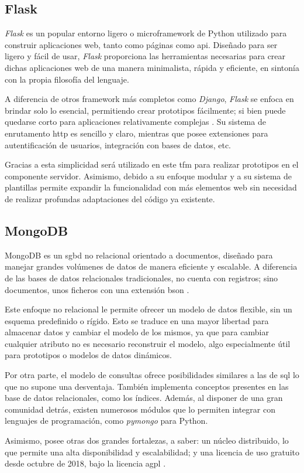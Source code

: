     \subsection{Flask}

        \textit{Flask} es un popular entorno ligero o \gls{microframework} de Python utilizado para construir aplicaciones web, tanto como páginas como \gls{api}. Diseñado para ser ligero y fácil de usar, \textit{Flask} proporciona las herramientas necesarias para crear dichas aplicaciones web de una manera minimalista, rápida y eficiente, en sintonía con la propia filosofía del lenguaje. 

        A diferencia de otros \gls{framework} más completos como \textit{Django}, \textit{Flask} se enfoca en brindar solo lo esencial, permitiendo crear prototipos fácilmente; si bien puede quedarse corto para aplicaciones relativamente complejas \cite{rodriguez_flask_2014}. Su sistema de enrutamento \gls{http} es sencillo y claro, mientras que posee extensiones para autentificación de usuarios, integración con bases de datos, etc. 

        Gracias a esta simplicidad será utilizado en este \gls{tfm} para realizar prototipos en el componente servidor. Asimismo, debido a su enfoque modular y a su sistema de plantillas permite expandir la funcionalidad con más elementos web sin necesidad de realizar profundas adaptaciones del código ya existente.


    \subsection{MongoDB}
        MongoDB es un \gls{sgbd} no relacional orientado a documentos, diseñado para manejar grandes volúmenes de datos de manera eficiente y escalable. A diferencia de las bases de datos relacionales tradicionales, no cuenta con registros; sino documentos, unos ficheros con una extensión \gls{bson} \cite{mongodb_json_nodate}. 

        Este enfoque no relacional le permite ofrecer un modelo de datos flexible, sin un esquema predefinido o rígido. Esto se traduce en una mayor libertad para almacenar datos y cambiar el modelo de los mismos, ya que para cambiar cualquier atributo no es necesario reconstruir el modelo, algo especialmente útil para prototipos o modelos de datos dinámicos.
        
        Por otra parte, el modelo de consultas ofrece posibilidades similares a las de \gls{sql} lo que no supone una desventaja. También implementa conceptos presentes en las base de datos relacionales, como los índices. Además, al disponer de una gran comunidad detrás, existen numerosos módulos que lo permiten integrar con lenguajes de programación, como \textit{pymongo} para Python. 

        Asimismo, posee otras dos grandes fortalezas, a saber: un núcleo distribuido, lo que permite una alta disponibilidad y escalabilidad; y una licencia de uso gratuito desde octubre de 2018, bajo la licencia \gls{agpl} \cite{mongodb_que_nodate}.